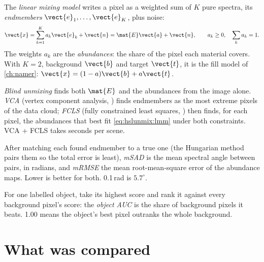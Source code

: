 \begin{definition}
The \emph{linear mixing model} writes a pixel as a weighted sum of $K$ pure spectra, its
\emph{endmembers} $\vect{e}_1,\dots,\vect{e}_K$, plus noise:
\begin{equation}
\vect{x}=\sum_{k=1}^{K}a_k\vect{e}_k+\vect{n}=\mat{E}\vect{a}+\vect{n},\qquad a_k\ge0,\quad \sum_k a_k=1 .
\label{eq:hslunmix:lmm}
\end{equation}
The weights $a_k$ are the \emph{abundances}: the share of the pixel each material covers. With $K=2$,
background $\vect{b}$ and target $\vect{t}$, it is the fill model of \cref{ch:namer}: $\vect{x}=(1-a)\vect{b}+a\vect{t}$.
\end{definition}

\begin{definition}
\emph{Blind unmixing} finds both $\mat{E}$ and the abundances from the image alone.
\emph{VCA} (vertex component analysis, \citep{nascimento2005vca}) finds endmembers as the most extreme
pixels of the data cloud; \emph{FCLS} (fully constrained least squares, \citep{heinz2001fcls}) then finds,
for each pixel, the abundances that best fit \cref{eq:hslunmix:lmm} under both constraints. VCA + FCLS takes seconds
per scene.
\end{definition}

\begin{definition}
After matching each found endmember to a true one (the Hungarian method pairs them so the total error is least),
\emph{mSAD} is the mean spectral angle between pairs, in radians, and \emph{mRMSE} the mean
root-mean-square error of the abundance maps. Lower is better for both. 0.1\,rad is $5.7^\circ$.
\end{definition}

\begin{definition}
For one labelled object, take its highest score and rank it against every background pixel's score: the
\emph{object AUC} is the share of background pixels it beats. 1.00 means the object's best pixel
outranks the whole background.
\end{definition}

\section{What was compared}\label{sec:hslunmix:setup}

